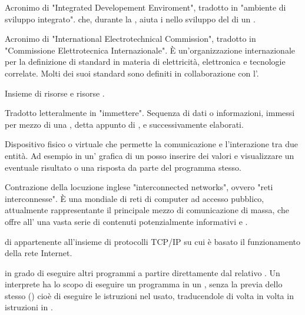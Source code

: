 { 
{Acronimo di "Integrated Developement Enviroment", tradotto in "ambiente di sviluppo integrato".  che, durante la , aiuta i  nello sviluppo del  di un .}

{Acronimo di "International Electrotechnical Commission", tradotto in "Commissione Elettrotecnica Internazionale". \`{E} un'organizzazione internazionale per la definizione di standard in materia di elettricità, elettronica e tecnologie correlate. Molti dei suoi standard sono definiti in collaborazione con l'.}


{Insieme di risorse  e risorse .}

{Tradotto letteralmente in "immettere". Sequenza di dati o informazioni, immessi per mezzo di una , detta appunto di , e successivamente elaborati.}

{Dispositivo fisico o virtuale che permette la comunicazione e l'interazione tra due entità. Ad esempio in un' grafica di un  posso inserire dei valori  e visualizzare un eventuale risultato o una risposta da parte del programma stesso.}

{Contrazione della locuzione inglese "interconnected networks", ovvero "reti interconnesse".
\`{E} una  mondiale di reti di computer ad accesso pubblico, attualmente rappresentante il principale mezzo di comunicazione di massa, che offre all' una vasta serie di contenuti potenzialmente informativi e .}

{ di  appartenente all'insieme di protocolli  TCP/IP su cui è basato il funzionamento della rete Internet.}

{ in grado di eseguire altri programmi a partire direttamente dal relativo . Un interprete ha lo scopo di eseguire un programma in un , senza la previa  dello stesso () cioè di eseguire le istruzioni nel  usato, traducendole di volta in volta in istruzioni in .}

}
